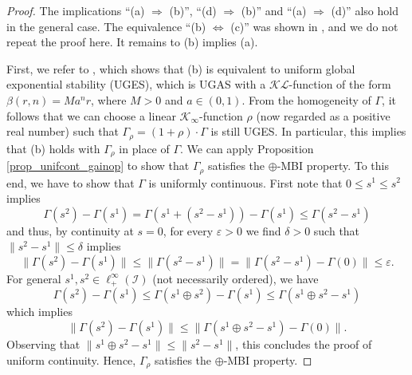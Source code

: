 \documentclass[10pt, oneside, a4paper]{article}
\newcommand{\ep}{\varepsilon}
\newcommand{\IC}{\mathcal{I}}
\newcommand{\KC}{\mathcal{K}}
\newcommand{\LC}{\mathcal{L}}
\begin{document}
\begin{proof}
The implications ``(a) $\Rightarrow$ (b)'', ``(d) $\Rightarrow$ (b)'' and ``(a) $\Rightarrow$ (d)'' also hold in the general case. The equivalence ``(b) $\Leftrightarrow$ (c)'' was shown in \cite[Prop.~8]{Mea}, and we do not repeat the proof here. It remains to (b) implies (a).%

First, we refer to \cite[Prop.~9]{Mea}, which shows that (b) is equivalent to uniform global exponential stability (UGES), which is UGAS with a $\KC\LC$-function of the form $\beta(r,n) = Ma^n r$, where $M > 0$ and $a \in (0,1)$. From the homogeneity of $\Gamma$, it follows that we can choose a linear $\KC_{\infty}$-function $\rho$ (now regarded as a positive real number) such that $\Gamma_{\rho} = (1 + \rho) \cdot \Gamma$ is still UGES. In particular, this implies that (b) holds with $\Gamma_{\rho}$ in place of $\Gamma$. We can apply Proposition \ref{prop_unifcont_gainop} to show that $\Gamma_{\rho}$ satisfies the $\oplus$-MBI property. To this end, we have to show that $\Gamma$ is uniformly continuous. First note that $0 \leq s^1 \leq s^2$ implies%
\begin{equation*}
  \Gamma(s^2) - \Gamma(s^1) = \Gamma(s^1 + (s^2 - s^1)) - \Gamma(s^1) \leq \Gamma(s^2 - s^1)%
\end{equation*}
and thus, by continuity at $s = 0$, for every $\ep > 0$ we find $\delta > 0$ such that $\|s^2 - s^1\| \leq \delta$ implies%
\begin{equation*}
  \|\Gamma(s^2) - \Gamma(s^1)\| \leq \|\Gamma(s^2 - s^1)\| = \|\Gamma(s^2 - s^1) - \Gamma(0)\| \leq \ep.%
\end{equation*}
For general $s^1,s^2 \in \ell^{\infty}_+(\IC)$ (not necessarily ordered), we have%
\begin{equation*}
  \Gamma(s^2) - \Gamma(s^1) \leq \Gamma(s^1 \oplus s^2) - \Gamma(s^1) \leq \Gamma(s^1 \oplus s^2 - s^1)%
\end{equation*}
which implies%
\begin{equation*}
  \|\Gamma(s^2) - \Gamma(s^1)\| \leq \|\Gamma(s^1 \oplus s^2 - s^1) - \Gamma(0)\|.%
\end{equation*}
Observing that $\|s^1 \oplus s^2 - s^1\| \leq \|s^2 - s^1\|$, this concludes the proof of uniform continuity. Hence, $\Gamma_{\rho}$ satisfies the $\oplus$-MBI property.%


\end{proof}
\end{document}
